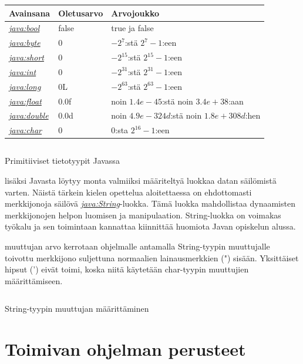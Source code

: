 \documentclass{tufte-book}
\newcommand{\java}[1]{\underline{\gls{java:#1}}}
\newcommand{\newjava}[1]{\textit{\java{#1}}}
\newcommand{\code}[3]{
\begin{listing}
    \inputminted{java}{OhjelmointiopasEsimerkit/src/#1/#2.java}
    \caption{#3}
    \label{Java-#1-#2}
\end{listing}
}
\begin{document}
\bigskip
\begin{center}
\footnotesize
\begin{tabular}{lll}
\toprule
Avainsana & Oletusarvo & Arvojoukko \\
\midrule
\newjava{bool} & false & true ja false \\
\addlinespace
\newjava{byte} & 0 & $-2^7$:stä $2^7-1$:een \\
\addlinespace
\newjava{short} & 0 & $-2^{15}$:stä $2^{15}-1$:een \\
\addlinespace
\newjava{int} & 0 & $-2^{31}$:stä $2^{31}-1$:een \\
\addlinespace
\newjava{long} & 0L & $-2^{63}$:stä $2^{63}-1$:een \\
\addlinespace
\newjava{float} & 0.0f & noin $1.4e-45$:stä noin $3.4e+38$:aan \\
\addlinespace
\newjava{double} & 0.0d & noin $4.9e-324d$:stä noin $1.8e+308d$:hen \\
\addlinespace
\newjava{char} & 0 & $0$:sta $2^{16}-1$:een \\
\bottomrule
\end{tabular}
\end{center}

\code{week2/basicexamples}{DataTypes}{Primitiiviset tietotyypit Javassa}

 lisäksi Javasta löytyy monta valmiiksi määriteltyä luokkaa datan
säilömistä varten. Näistä tärkein kielen opettelua aloitettaessa on ehdottomasti merkkijonoja
säilövä \newjava{String}-luokka. Tämä luokka mahdollistaa dynaamisten merkkijonojen helpon
luomisen ja manipulaation. String-luokka on voimakas työkalu ja sen toimintaan kannattaa
kiinnittää huomiota Javan opiskelun alussa.

 muuttujan arvo kerrotaan ohjelmalle antamalla String-tyypin
muuttujalle toivottu merkkijono suljettuna normaalien lainausmerkkien (") sisään. Yksittäiset 
hipsut (') eivät toimi, koska niitä käytetään char-tyypin muuttujien määrittämiseen.

\code{week2/basicexamples}{StringUsage}{String-tyypin muuttujan määrittäminen}


\section{Toimivan ohjelman perusteet}
\label{ohjelman perusteista}
\end{document}
